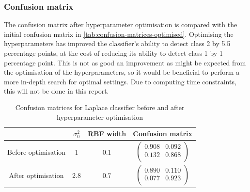 \documentclass[a4paper]{article}
\begin{document}
    \subsubsection{Confusion matrix}
    The confusion matrix after hyperparameter optimisation is compared with the initial confusion matrix in \autoref{tab:confusion-matrices-optimised}.
    Optimising the hyperparameters has improved the classifier's ability to detect class 2 by 5.5 percentage points, at the cost of reducing its ability to detect class 1 by 1 percentage point.
    This is not as good an improvement as might be expected from the optimisation of the hyperparameters, so it would be beneficial to perform a more in-depth search for optimal settings.
    Due to computing time constraints, this will not be done in this report.
    \begin{table}[h!]
        \centering
        \begin{tabular}{c c c c}
            & $\sigma_0^2$ & \textbf{RBF width} & \textbf{Confusion matrix} \\
            \hline
            Before optimisation & 1 & 0.1 &
            $\begin{pmatrix}
                0.908 & 0.092 \\
                0.132 & 0.868 \\
            \end{pmatrix}$ \\
            After optimisation & 2.8 & 0.7 &
            $\begin{pmatrix}
                0.890 & 0.110 \\
                0.077 & 0.923 \\
            \end{pmatrix}$ \\
        \end{tabular}
        \caption{Confusion matrices for Laplace classifier before and after hyperparameter optimisation}
        \label{tab:confusion-matrices-optimised}
    \end{table}
\end{document}
